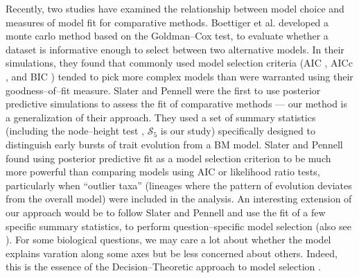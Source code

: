 \documentclass[a4paper,12pt]{article}
\begin{document}
Recently, two studies have examined the relationship between model choice and measures of model fit for comparative methods. Boettiger et al. \citep{Boettiger2012} developed a monte carlo method based on the Goldman--Cox \citep{Goldman} test, to evaluate whether a dataset is informative enough to select between two alternative models. In their simulations, they found that commonly used model selection criteria (AIC \citep{Akaike1974}, AICc \citep{AICC}, and BIC \citep{Schwarz1978}) tended to pick more complex models than were warranted using their goodness--of--fit measure. Slater and Pennell \citep{SlaterPennell} were the first to use posterior predictive simulations to assess the fit of comparative methods --- our method is a generalization of their approach. They used a set of summary statistics (including the node--height test \citep{FreckletonHarvey2006}, $\mathcal{S}_ 5$ is our study) specifically designed to distinguish early bursts of trait evolution from a BM model. Slater and Pennell found using posterior predictive fit as a model selection criterion to be much more powerful than comparing models using AIC or likelihood ratio tests, particularly when ``outlier taxa'' (lineages where the pattern of evolution deviates from the overall model) were included in the analysis. An interesting extension of our approach would be to follow Slater and Pennell and use the fit of a few specific summary statistics, to perform question--specific model selection (also see \citep{Bollback2002, Lewis2013}). For some biological questions, we may care a lot about whether the model explains varation along some axes but be less concerned about others. Indeed, this is the essence of the Decision--Theoretic approach to model selection \citep{Robert2007}.
\end{document}
